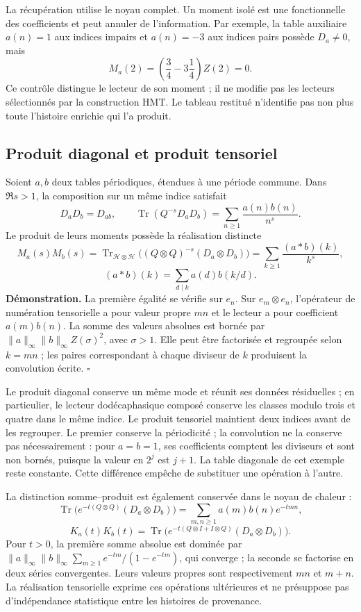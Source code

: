 La récupération utilise le noyau complet. Un moment isolé est une
fonctionnelle des coefficients et peut annuler de l'information. Par exemple,
la table auxiliaire $a(n)=1$ aux indices impairs et $a(n)=-3$ aux indices pairs
possède $D_a\ne0$, mais
\[
 M_a(2)=\left(\frac34-3\frac14\right)Z(2)=0.
\]
Ce contrôle distingue le lecteur de son moment ; il ne modifie pas les lecteurs
sélectionnés par la construction HMT. Le tableau restitué n'identifie pas non plus
toute l'histoire enrichie qui l'a produit.

\subsection{Produit diagonal et produit tensoriel}
Soient $a,b$ deux tables périodiques, étendues à une période commune. Dans $\Re s>1$, la composition sur un même indice satisfait
\[
 D_aD_b=D_{ab},\qquad
 \operatorname{Tr}(Q^{-s}D_aD_b)=\sum_{n\geq1}\frac{a(n)b(n)}{n^s}.
\]
Le produit de leurs moments possède la réalisation distincte
\[
 M_a(s)M_b(s)=
 \operatorname{Tr}_{\mathcal H\otimes\mathcal H}
 \bigl((Q\otimes Q)^{-s}(D_a\otimes D_b)\bigr)
 =\sum_{k\geq1}\frac{(a*b)(k)}{k^s},
\]
\[
 (a*b)(k)=\sum_{d\mid k}a(d)b(k/d).
\]
\textbf{Démonstration.} La première égalité se vérifie sur $e_n$.
Sur $e_m\otimes e_n$, l'opérateur de numération tensorielle a pour
valeur propre $mn$ et le lecteur a pour coefficient $a(m)b(n)$. La somme des
valeurs absolues est bornée par
$\|a\|_\infty\|b\|_\infty Z(\sigma)^2$, avec $\sigma>1$.
Elle peut être factorisée et regroupée selon $k=mn$ ; les paires correspondant
à chaque diviseur de $k$ produisent la convolution écrite. \hfill$\square$

Le produit diagonal conserve un même mode et réunit ses données résiduelles ;
en particulier, le lecteur dodécaphasique composé conserve les classes
modulo trois et quatre dans le même indice. Le produit tensoriel maintient
deux indices avant de les regrouper. Le premier conserve la périodicité ; la
convolution ne la conserve pas nécessairement : pour $a=b=1$, ses coefficients comptent les
diviseurs et sont non bornés, puisque la valeur en $2^j$ est $j+1$.
La table diagonale de cet exemple reste constante. Cette différence
empêche de substituer une opération à l'autre.

La distinction somme--produit est également conservée dans le noyau de chaleur :
\[
 \operatorname{Tr}\bigl(e^{-t(Q\otimes Q)}(D_a\otimes D_b)\bigr)
 =\sum_{m,n\geq1}a(m)b(n)e^{-tmn},
\]
\[
 K_a(t)K_b(t)=\operatorname{Tr}
 \bigl(e^{-t(Q\otimes I+I\otimes Q)}(D_a\otimes D_b)\bigr).
\]
Pour $t>0$, la première somme absolue est dominée par $\|a\|_\infty\|b\|_\infty\sum_{m\geq1}e^{-tm}/(1-e^{-tm})$, qui converge ; la seconde se factorise en deux séries convergentes. Leurs valeurs propres sont respectivement $mn$ et $m+n$. La réalisation tensorielle exprime ces opérations ultérieures et ne présuppose pas d'indépendance statistique entre les histoires de provenance.
